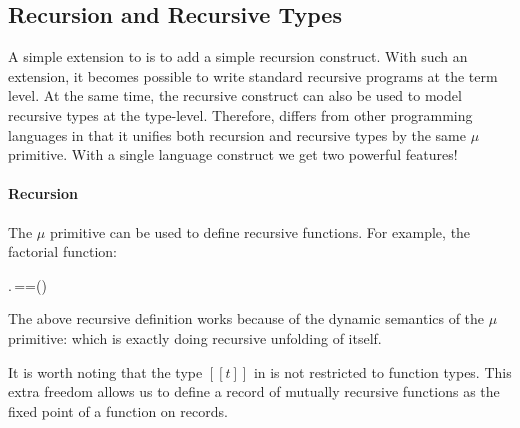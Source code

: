 \subsection{Recursion and Recursive Types}


A simple extension to \name is to add a simple recursion construct.
With such an extension, it becomes possible to write standard
recursive programs at the term level. At the same time, the recursive
construct can also be used to model recursive types at the type-level.
Therefore, \name differs from other programming languages in that it
unifies both recursion and recursive types by the same $\mu$
primitive. With a single language construct we get two powerful
features!

\paragraph{Recursion}

The $\mu$ primitive can be used to define recursive functions.  For
example, the factorial function:
\begin{hscode}\SaveRestoreHook
{}%
%
%
\>[3]{}\mu\;\mathbin{:}\to {}.\,\;==\;\;\;\;\;\times\;\;(\mathbin{-}){}\<[E]%
\ColumnHook
\end{hscode}\resethooks
The above recursive definition works because of the dynamic semantics of the
$\mu$ primitive: \ottusedrule{\ottdruleSXXMu{}} which is exactly doing
recursive unfolding of itself.

It is worth noting that the type $[[t]]$ in  is not
restricted to function types. This extra freedom allows us to define a
record of mutually recursive functions as the fixed point of a
function on records.


